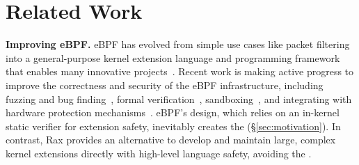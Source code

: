 \vspace{-8pt}
\section{Related Work}
\label{sec:related}
\vspace{-5pt}

{\bf Improving eBPF.} eBPF has evolved from simple
    use cases like packet filtering~\cite{pf,bsdpf}
    into a general-purpose kernel extension language and programming framework
    that enables many innovative projects~\cite{BMC,Electrode,DINT,Hoiland-Jorgensen:conext:2018,
    Zhong:osdi:2022,ghost-scheduler-lpc,ebpf-mm,
    ghost-scheduler,lpc-24-bpfmm,fetchbpf,sched-ext}.
Recent work is making active progress to improve the correctness and security
    of the eBPF infrastructure, including
    fuzzing and bug finding~\cite{hung2023brf,hao-eurosys,hao-osdi,ebpf-fuzzing},
    formal verification~\cite{ebpf-jit-formal,proof-carrying-verifier,Wang:2014,hari-cav-verification},
    sandboxing~\cite{sandbpf,beebox-security24,safebpf-thomas},
    and integrating with hardware protection mechanisms~\cite{hive-ebpf-sandbox,lu2024moat}.
eBPF's design, which relies on an in-kernel static verifier for extension safety,
    inevitably creates the \gap{} (\S\ref{sec:motivation}).
In contrast, Rax provides an alternative to develop and maintain large, complex kernel extensions directly with
    high-level language safety, avoiding the \gap{}.




